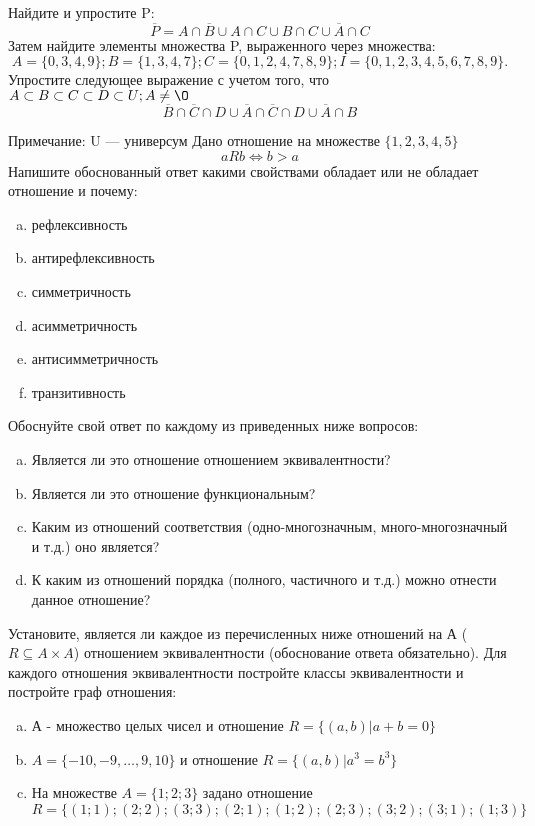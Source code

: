 \documentclass[10pt]{exam}
\begin{document}
\begin{questions}
\question
Найдите и упростите P:
\begin{equation*}
\overline{P} = A \cap \overline{B} \cup A \cap C \cup B \cap C \cup \overline{A} \cap C
\end{equation*}
Затем найдите элементы множества P, выраженного через множества:
\begin{equation*}
A = \{0, 3, 4, 9\}; 
B = \{1, 3, 4, 7\};
C = \{0, 1, 2, 4, 7, 8, 9\};
I = \{0, 1, 2, 3, 4, 5, 6, 7, 8, 9\}.
\end{equation*}\question
Упростите следующее выражение с учетом того, что $A\subset B \subset C \subset D \subset U; A \neq \O$
\begin{equation*}
\overline{B} \cap \overline{C} \cap D \cup \overline{A} \cap \overline{C} \cap D \cup \overline{A} \cap B
\end{equation*}

Примечание: U — универсум\question
Дано отношение на множестве $\{1, 2, 3, 4, 5\}$ 
\begin{equation*}
aRb \iff b > a
\end{equation*}
Напишите обоснованный ответ какими свойствами обладает или не обладает отношение и почему:   
\begin{enumerate} [a)]\setcounter{enumi}{0}
\item рефлексивность
\item антирефлексивность
\item симметричность
\item асимметричность
\item антисимметричность
\item транзитивность
\end{enumerate}

Обоснуйте свой ответ по каждому из приведенных ниже вопросов:
\begin{enumerate} [a)]\setcounter{enumi}{0}
    \item Является ли это отношение отношением эквивалентности?
    \item Является ли это отношение функциональным?
    \item Каким из отношений соответствия (одно-многозначным, много-многозначный и т.д.) оно является?
    \item К каким из отношений порядка (полного, частичного и т.д.) можно отнести данное отношение?
\end{enumerate}

\question
Установите, является ли каждое из перечисленных ниже отношений на А ($R \subseteq A \times A$) отношением эквивалентности (обоснование ответа обязательно). Для каждого отношения эквивалентности 
постройте классы эквивалентности и постройте граф отношения:
\begin{enumerate}[a)]\setcounter{enumi}{0}
\item А - множество целых чисел и отношение $R = \{(a,b)|a + b = 0\}$
\item $A = \{-10, -9, …, 9, 10\}$ и отношение $R = \{(a,b)|a^{3} = b^{3}\}$
\item На множестве $A = \{1; 2; 3\}$ задано отношение $R = \{(1; 1); (2; 2); (3; 3); (2; 1); (1; 2); (2; 3); (3; 2); (3; 1); (1; 3)\}$


\end{enumerate}
\end{questions}
\end{document}
